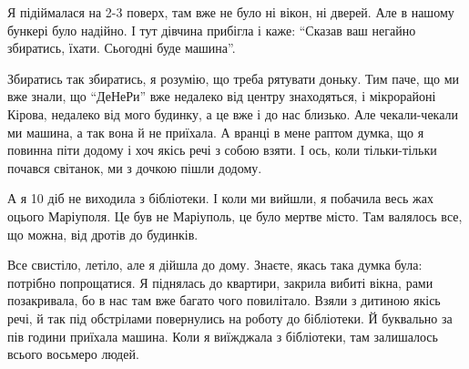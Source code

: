 Я підіймалася на 2-3 поверх, там вже не було ні вікон, ні дверей. Але в нашому
бункері було надійно. І тут дівчина прибігла і каже: \enquote{Сказав ваш негайно
збиратись, їхати. Сьогодні буде машина}.

Збиратись так збиратись, я розумію, що треба рятувати доньку. Тим паче, що ми
вже знали, що \enquote{ДеНеРи} вже недалеко від центру знаходяться, і мікрорайоні
Кірова, недалеко від мого будинку, а це вже і до нас близько. Але чекали-чекали
ми машина, а так вона й не приїхала. А вранці в мене раптом думка, що я повинна
піти додому і хоч якісь речі з собою взяти. І ось, коли тільки-тільки почався
світанок, ми з дочкою пішли додому.

\begin{qqquote}
А я 10 діб не виходила з бібліотеки. І коли ми вийшли, я побачила весь жах
оцього Маріуполя. Це був не Маріуполь, це було мертве місто. Там валялось все,
що можна, від дротів до будинків.	
\end{qqquote}


Все свистіло, летіло, але я дійшла до дому. Знаєте, якась така думка була:
потрібно попрощатися. Я піднялась до квартири, закрила вибиті вікна, рами
позакривала, бо в нас там вже багато чого повилітало. Взяли з дитиною якісь
речі, й так під обстрілами повернулись на роботу до бібліотеки. Й буквально за
пів години приїхала машина. Коли я виїжджала з бібліотеки, там залишалось
всього восьмеро людей.

